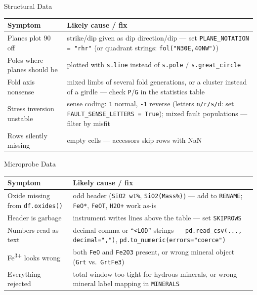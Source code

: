 \documentclass[aspectratio=169,11pt]{beamer}
\begin{document}
\begin{frame}{Structural Data}
  \small
  \begin{tabularx}{\textwidth}{l>{\raggedright\arraybackslash}X}
    \toprule
    \textbf{Symptom} & \textbf{Likely cause / fix} \\
    \midrule
    Planes plot 90\textdegree{} off & strike/dip given as dip direction/dip --- set
      \texttt{PLANE\_NOTATION = "rhr"} (or quadrant strings: \texttt{fol("N30E,40NW")}) \\
    Poles where planes should be & plotted with \texttt{s.line} instead of
      \texttt{s.pole} / \texttt{s.great\_circle} \\
    Fold axis nonsense & mixed limbs of several fold generations, or a cluster instead
      of a girdle --- check \texttt{P}/\texttt{G} in the statistics table \\
    Stress inversion unstable & sense coding: \texttt{1} normal, \texttt{-1} reverse
      (letters \texttt{n/r/s/d}: set \texttt{FAULT\_SENSE\_LETTERS = True}); mixed
      fault populations --- filter by misfit \\
    Rows silently missing & empty cells --- accessors skip rows with NaN \\
    \bottomrule
  \end{tabularx}
\end{frame}

\begin{frame}{Microprobe Data}
  \small
  \begin{tabularx}{\textwidth}{l>{\raggedright\arraybackslash}X}
    \toprule
    \textbf{Symptom} & \textbf{Likely cause / fix} \\
    \midrule
    Oxide missing from \texttt{df.oxides()} & odd header (\texttt{SiO2 wt\%}, \texttt{SiO2(Mass\%)})
      --- add to \texttt{RENAME}; \texttt{FeO*}, \texttt{FeOT}, \texttt{H2O+} work as-is \\
    Header is garbage & instrument writes lines above the table --- set \texttt{SKIPROWS} \\
    Numbers read as text & decimal comma or ``\texttt{<LOD}'' strings ---
      \texttt{pd.read\_csv(..., decimal=",")}, \texttt{pd.to\_numeric(errors="coerce")} \\
    Fe\textsuperscript{3+} looks wrong & both \texttt{FeO} and \texttt{Fe2O3} present, or
      wrong mineral object (\texttt{Grt} vs.\ \texttt{GrtFe3}) \\
    Everything rejected & total window too tight for hydrous minerals, or wrong
      mineral label mapping in \texttt{MINERALS} \\
    \bottomrule
  \end{tabularx}
\end{frame}
\end{document}
